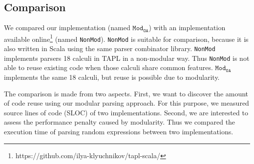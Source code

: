 





\subsection{Comparison}\label{subsec:cs-comparison}

\newcommand\ourimpl{$\texttt{Mod}_{\texttt{OA}}$}
\newcommand\ilyaimpl{\texttt{NonMod}}
\newcommand\ourclass{$\texttt{Mod}_{\texttt{CLASS}}$}
\newcommand\ilyalongest{$\texttt{NonMod}_{\texttt{|||}}$}

We compared our implementation (named \ourimpl{}) with an implementation
available online\footnote{https://github.com/ilya-klyuchnikov/tapl-scala/} (named \ilyaimpl{}).
\ilyaimpl{} is suitable for comparison, because it is also
written in Scala using the same parser combinator library.
\ilyaimpl{} implements parsers 18 calculi in TAPL in a non-modular
way. Thus \ilyaimpl{} is not able to reuse existing
code when those calculi share common features.
\ourimpl{} implements the same 18 calculi, but reuse 
is possible due to modularity.

The comparison is made from two aspects. First, we want to discover
the amount of code reuse using our modular parsing approach.
For this purpose, we measured source lines of code (SLOC) of two implementations.
Second, we are interested to assess the performance penalty caused by modularity.
Thus we compared the execution time of parsing random expressions between two implementations.


